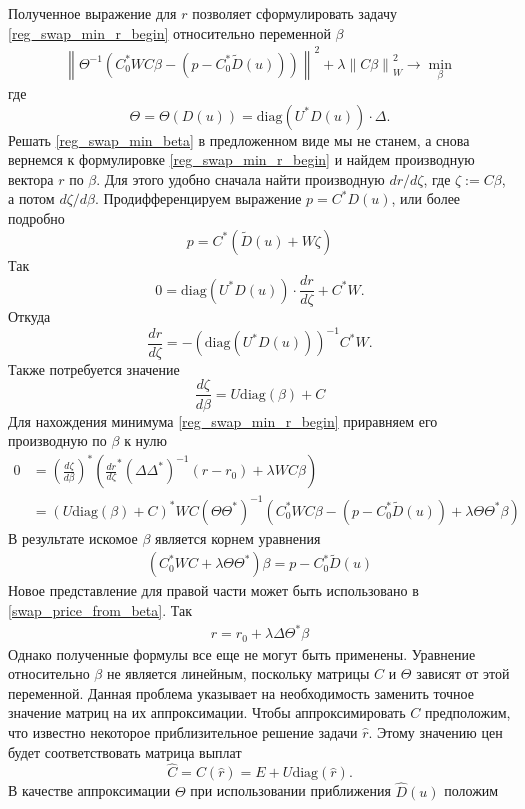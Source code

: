 \documentclass[10pt]{article}
\theoremstyle{definition}
\theoremstyle{remark}
\theoremstyle{plain}
\newcommand{\wt}{\widetilde}
\newcommand{\diag}{\mathrm{diag}}
\begin{document}
Полученное выражение для $r$ позволяет сформулировать задачу \eqref{reg_swap_min_r_begin} относительно переменной $\beta$
\begin{align}
\left\| 
	\Theta^{-1}
	\left(C_0^*WC\beta - (p-C_0^*\wt{D}(u))\right)
\right\|^2 +
\lambda
\left\|C\beta\right\|^2_W 
\rightarrow \min\limits_{\beta} \label{reg_swap_min_beta}
\end{align}
где 
$$
\Theta = \Theta(D(u)) =  \diag\left(U^*D(u)\right)\cdot\Delta.
$$
Решать \eqref{reg_swap_min_beta} в предложенном виде мы не станем, а снова вернемся к формулировке \eqref{reg_swap_min_r_begin}  и найдем производную вектора $r$ по $\beta$. Для этого удобно сначала найти производную $dr/d\zeta$, где $\zeta := C\beta$, а потом $d\zeta/d\beta$. Продифференцируем выражение $p = C^*D(u)$, или более подробно
$$
p = C^*\left(\wt{D}(u)+ W\zeta\right)
$$
Так
$$
0 = \diag\left(U^*D(u)\right) \cdot \frac{dr}{d\zeta} + C^*W.
$$
Откуда
$$
\frac{dr}{d\zeta} = - \left(\diag\left(U^*D(u)\right)\right)^{-1} C^*W.
$$
Также потребуется значение
$$
\frac{d\zeta}{d\beta} = U\diag(\beta)+C
$$
Для нахождения минимума \eqref{reg_swap_min_r_begin} приравняем его производную по $\beta$ к нулю
\begin{align*}
0 &= \left(\frac{d\zeta}{d\beta}\right)^*
\left(
\frac{dr}{d\zeta}^*
\left(\Delta\Delta^*\right)^{-1}
\left(r-r_0\right) +
\lambda WC\beta
\right)
\\
&=
(U\diag(\beta)+C)^*WC(\Theta\Theta^*)^{-1}
\left(C_0^*WC\beta - (p-C_0^*\wt{D}(u)) +
\lambda \Theta\Theta^* \beta\right)
\end{align*}
В результате искомое $\beta$ является корнем уравнения
\begin{align}
(C_0^*WC + \lambda \Theta\Theta^*) \beta = p-C_0^*\wt{D}(u) \label{swap_b_implic}
\end{align}
Новое представление для правой части может быть использовано в \eqref{swap_price_from_beta}. Так  
\begin{align*}
r =  r_0 + \lambda \Delta\Theta^*\beta
\end{align*}
Однако полученные формулы все еще не могут быть применены. Уравнение относительно $\beta$ не является линейным, поскольку матрицы $C$ и $\Theta$ зависят от этой переменной. Данная проблема указывает на необходимость заменить точное значение матриц на их аппроксимации. Чтобы аппроксимировать $C$ предположим, что известно некоторое приблизительное решение задачи $\hat{r}$. Этому значению цен будет соответствовать матрица выплат 
$$
\widehat{C} = C(\hat{r}) = E+U\diag(\hat{r}).
$$
В качестве аппроксимации $\Theta$ при использовании приближения $\widehat{D}(u)$ положим
\end{document}
